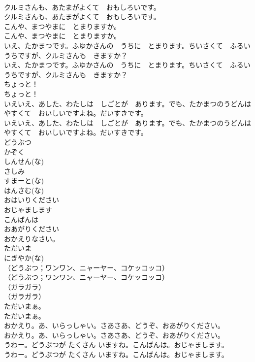 \documentclass[8pt]{extreport}
\begin{document}
\begin{CJK}{UTF8}{min}
\\	クルミさんも、あたまがよくて　おもしろいです。	
\\	クルミさんも、あたまがよくて　おもしろいです。 
\\	こんや、まつやまに　とまりますか。	
\\	こんや、まつやまに　とまりますか。 
\\	いえ、たかまつです。ふゆかさんの　うちに　とまります。ちいさくて　ふるいうちですが、クルミさんも　きますか？	
\\	いえ、たかまつです。ふゆかさんの　うちに　とまります。ちいさくて　ふるいうちですが、クルミさんも　きますか？ 
\\	ちょっと！	
\\	ちょっと！ 
\\	いえいえ、あした、わたしは　しごとが　あります。でも、たかまつのうどんは　やすくて　おいしいですよね。だいすきです。	
\\	いえいえ、あした、わたしは　しごとが　あります。でも、たかまつのうどんは　やすくて　おいしいですよね。だいすきです。 
\\	どうぶつ
\\	かぞく
\\	しんせん(な)
\\	さしみ
\\	すまーと(な)
\\	はんさむ(な)
\\	おはいりください
\\	おじゃまします
\\	こんばんは
\\	おあがりください
\\	おかえりなさい。
\\	ただいま
\\	にぎやか(な)
\\	（どうぶつ；ワンワン、ニャーヤー、コケッコッコ）	
\\	（どうぶつ；ワンワン、ニャーヤー、コケッコッコ） 
\\	（ガラガラ）	
\\	（ガラガラ） 
\\	ただいまぁ。	
\\	ただいまぁ。 
\\	おかえり。あ、いらっしゃい。さあさあ、どうぞ、おあがりください。	
\\	おかえり。あ、いらっしゃい。さあさあ、どうぞ、おあがりください。 
\\	うわー。どうぶつが たくさん いますね。こんばんは。おじゃまします。	
\\	うわー。どうぶつが たくさん いますね。こんばんは。おじゃまします。 

\end{CJK}
\end{document}
